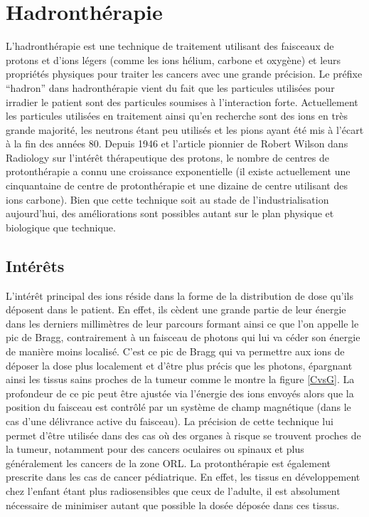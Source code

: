 \documentclass[11pt,a4paper,oldfontcommands]{memoir}
\begin{document}
\section{Hadronthérapie}
L'hadronthérapie est une technique de traitement utilisant des faisceaux de protons et d'ions légers (comme les ions hélium, carbone et oxygène) et leurs propriétés physiques pour traiter les cancers avec une grande précision. Le préfixe \enquote{hadron} dans hadronthérapie vient du fait que les particules utilisées pour irradier le patient sont des particules soumises à l'interaction forte. Actuellement les particules utilisées en traitement ainsi qu'en recherche sont des ions en très grande majorité, les neutrons étant peu utilisés et les pions ayant été mis à l'écart à la fin des années 80. Depuis 1946 et l'article pionnier de Robert Wilson dans Radiology\cite{wilson} sur l'intérêt thérapeutique des protons, le nombre de centres de protonthérapie a connu une croissance exponentielle (il existe actuellement une cinquantaine de centre de protonthérapie et une dizaine de centre utilisant des ions carbone). Bien que cette technique soit au stade de l'industrialisation aujourd'hui, des améliorations sont possibles autant sur le plan physique et biologique que technique. 
\subsection{Intérêts}
L'intérêt principal des ions réside dans la forme de la distribution de dose qu'ils déposent dans le patient. En effet, ils cèdent une grande partie de leur énergie dans les derniers millimètres de leur parcours formant ainsi ce que l'on appelle le pic de Bragg, contrairement à un faisceau de photons qui lui va céder son énergie de manière moins localisé. C'est ce pic de Bragg qui va permettre aux ions de déposer la dose plus localement et d'être plus précis que les photons, épargnant ainsi les tissus sains proches de la tumeur comme le montre la figure \ref{CvsG}. La profondeur de ce pic peut être ajustée via l'énergie des ions envoyés alors que la position du faisceau est contrôlé par un système de champ magnétique (dans le cas d'une délivrance active du faisceau). La précision de cette technique lui permet d'être utilisée dans des cas où des organes à risque se trouvent proches de la tumeur, notamment pour des cancers oculaires ou spinaux et plus généralement les cancers de la zone ORL. La protonthérapie est également prescrite dans les cas de cancer pédiatrique. En effet, les tissus en développement chez l'enfant étant plus radiosensibles que ceux de l'adulte, il est absolument nécessaire de minimiser autant que possible la dosée déposée dans ces tissus. \\
\end{document}
